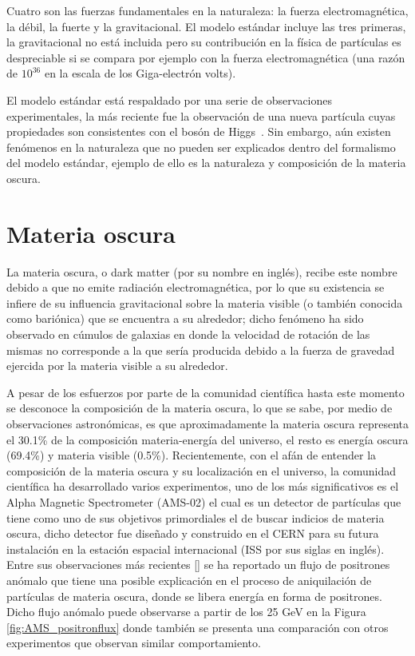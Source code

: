 Cuatro son las fuerzas fundamentales en la naturaleza: la fuerza electromagnética, la débil, la fuerte y la gravitacional. El modelo estándar incluye las tres primeras, la gravitacional no está incluida pero su contribución en la física de partículas es despreciable si se compara por ejemplo con la fuerza electromagnética (una razón de $10^{36}$ en la escala de los Giga-electrón volts). 

El modelo estándar está respaldado por una serie de observaciones experimentales, la más reciente fue la observación de una nueva partícula cuyas propiedades son consistentes con el bosón de Higgs~\cite{higgs}. Sin embargo, aún existen fenómenos en la naturaleza que no pueden ser explicados dentro del formalismo del modelo estándar, ejemplo de ello es la naturaleza y composición de la materia oscura.

\section{Materia oscura}

La materia oscura, o dark matter (por su nombre en inglés), recibe este nombre
debido a que no emite radiación electromagnética, por lo que su existencia se infiere de su influencia gravitacional sobre la materia visible (o también conocida como bariónica) que se encuentra a su alrededor; dicho fenómeno ha sido observado en cúmulos de galaxias en donde la velocidad de rotación de las mismas no corresponde a la que sería producida debido a la fuerza de gravedad ejercida por la materia visible a su alrededor.

A pesar de los esfuerzos por parte de la comunidad científica hasta este momento se desconoce la composición de la materia oscura, lo que se sabe, por medio de observaciones astronómicas, es que aproximadamente la materia oscura representa el 30.1\% de la composición materia-energía del universo, el resto es energía oscura (69.4\%) y materia visible (0.5\%). Recientemente, con el afán de entender la composición de la materia oscura y su localización en el universo, la comunidad científica ha desarrollado varios experimentos, uno de los más significativos es el Alpha Magnetic Spectrometer (AMS-02) el cual es un detector de partículas que tiene como uno de sus objetivos primordiales el de buscar indicios de materia oscura, dicho detector fue diseñado y construido en el CERN para su futura instalación en la estación espacial internacional (ISS por sus siglas en inglés). Entre sus observaciones más recientes [] se ha reportado un flujo de positrones anómalo que tiene una posible explicación en el proceso de aniquilación de partículas de materia oscura, donde se libera energía en forma de positrones. Dicho flujo anómalo puede observarse
a partir de los 25 GeV en la Figura \ref{fig:AMS_positronflux} donde también se presenta una comparación con otros experimentos que observan similar comportamiento.

